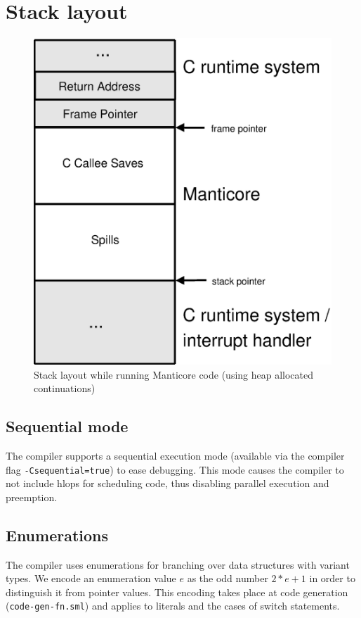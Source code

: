 \documentclass[11pt]{article}
\begin{document}
\section{Stack layout}
\begin{figure}[tp]
  \begin{center}
    \includegraphics[scale=0.5]{pictures/stack-heap-alloc}
  \end{center}%
  \caption{Stack layout while running Manticore code (using heap allocated
    continuations)}
  \label{fig:stack-heap-alloc}
\end{figure}%

\subsection{Sequential mode}
The compiler supports a sequential execution mode (available via the compiler flag
{\tt -Csequential=true}) to ease debugging.
This mode causes the compiler to not include hlops for scheduling code, thus disabling parallel execution
and preemption.

\subsection{Enumerations}
The compiler uses enumerations for branching over data structures with variant types.
We encode an enumeration value $e$ as the odd number $2*e+1$ in order to distinguish it from pointer
values.
This encoding takes place at code generation ({\tt code-gen-fn.sml}) and applies to literals
and the cases of switch statements.
\end{document}
